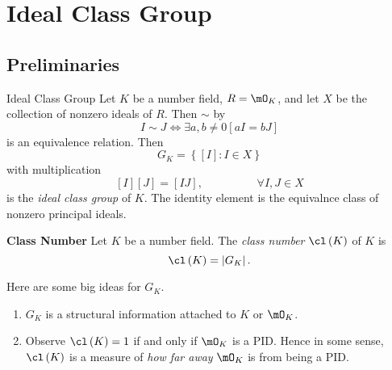 \documentclass[pmath441]{subfiles}
\begin{document}
    \section{Ideal Class Group}
    
    \subsection{Preliminaries}

    \begin{boxyrecall}{Ideal Class Group}
        Let $K$ be a number field, $R=\mO_K$, and let $X$ be the collection of nonzero ideals of $R$. Then $\sim$ by
        \begin{equation*}
            I\sim J \iff \exists a,b\neq 0\left[ aI=bJ \right]
        \end{equation*}
        is an equivalence relation. Then
        \begin{equation*}
            G_K = \left\lbrace \left[ I \right]:I\in X \right\rbrace
        \end{equation*}
        with multiplication
        \begin{equation*}
            \left[ I \right]\left[ J \right] = \left[ IJ \right], \hspace{2cm}\forall I,J\in X
        \end{equation*}
        is the \emph{ideal class group} of $K$. The identity element is the equivalnce class of nonzero principal ideals.
    \end{boxyrecall}
    
    \begin{definition}{\textbf{Class Number}}
        Let $K$ be a number field. The \emph{class number} $\cl\left( K \right)$ of $K$ is
        \begin{equation*}
            \cl\left( K \right) = \left| G_K \right|.
        \end{equation*}
    \end{definition}

    \np Here are some big ideas for $G_K$.
    \begin{enumerate}
        \item $G_K$ is a structural information attached to $K$ or $\mO_K$.
        \item Observe $\cl\left( K \right) = 1$ if and only if $\mO_K$ is a PID. Hence in some sense, $\cl\left( K \right)$ is a measure of \textit{how far away} $\mO_K$ is from being a PID.
    \end{enumerate}
    
\end{document}
